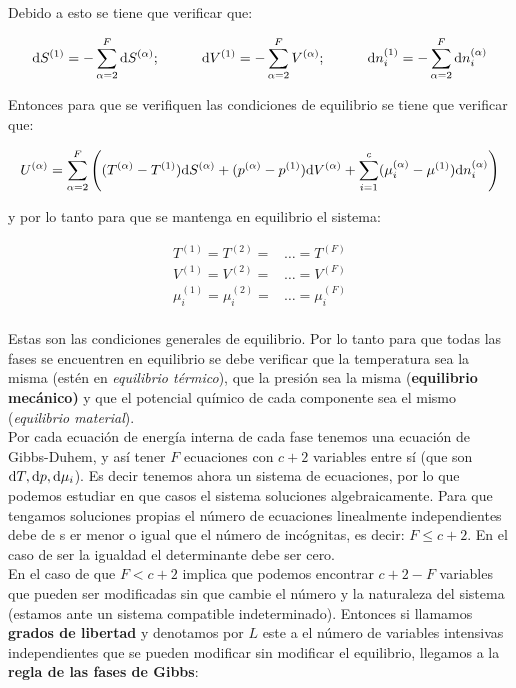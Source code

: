 \documentclass[12pt]{book}
\begin{document}
Debido a esto se tiene que verificar que:

\begin{equation}
\mathrm{d} S^{(1)}= - \sum_{\alpha=2}^F \mathrm{d} S^{(\alpha)}; \quad \quad \quad \mathrm{d} V^{(1)} = - \sum_{\alpha=2}^F V^{(\alpha)}; \quad \quad \quad \mathrm{d} n_i^{(1)} =- \sum_{\alpha=2}^F \mathrm{d} n_i^{(\alpha)}
\end{equation}


Entonces para que se verifiquen las condiciones de equilibrio se tiene que verificar que:

$$  U^{(\alpha)} = \sum_{\alpha=2}^F  \left( (T^{(\alpha)}-T^{(1)}) \mathrm{d} S^{(\alpha)} + (p^{(\alpha)}-p^{(1)}) \mathrm{d} V^{(\alpha)} + \sum_{i=1}^c (\mu_i^{(\alpha)}-\mu^{(1)}) \mathrm{d} n_i^{(\alpha)} \right) $$

y por lo tanto para que se mantenga en equilibrio el sistema:

\begin{equation}
\begin{array}{ll}
T^{(1)} = T^{(2)} = & \ldots = T^{(F)} \\
V^{(1)} = V^{(2)} = & \ldots = V^{(F)} \\
\mu_i^{(1)} = \mu_i^{(2)} = & \ldots = \mu_i^{(F)} \\
\end{array}
\end{equation}

Estas son las condiciones generales de equilibrio. Por lo tanto para que todas las fases se encuentren en equilibrio se debe verificar que la temperatura sea  la misma (estén en \textit{equilibrio térmico}), que la presión sea la misma (\textbf{equilibrio mecánico)} y que el potencial químico de cada componente sea el mismo (\textit{equilibrio material}). \\

Por cada ecuación de energía interna de cada fase tenemos una ecuación de Gibbs-Duhem, y así tener $F$ ecuaciones con $c+2$ variables entre sí (que son $\mathrm{d} T, \mathrm{d} p, \mathrm{d} \mu_i$). Es decir tenemos ahora un sistema de ecuaciones, por lo que podemos estudiar en que casos el sistema soluciones algebraicamente. Para que tengamos soluciones propias el número de ecuaciones linealmente independientes debe de s er menor o igual que el número de incógnitas, es decir: $F \leq c+2$. En el caso de ser la igualdad el determinante debe ser cero. \\

En el caso de que $F < c+2$ implica que podemos encontrar $c+2-F$ variables que pueden ser modificadas sin que cambie el número y la naturaleza del sistema (estamos ante un sistema compatible indeterminado). Entonces si llamamos \textbf{grados de libertad} y denotamos por $L$ este a el número de variables intensivas independientes que se pueden modificar sin modificar el equilibrio, llegamos a la \textbf{regla de las fases de Gibbs}:
\end{document}

